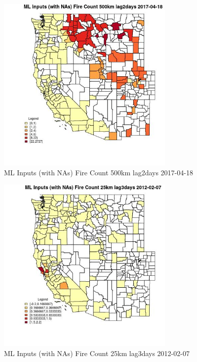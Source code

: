 \begin{figure} 
\centering  
\includegraphics[width=0.77\textwidth]{Code_Outputs/Report_ML_input_PM25_Step4_part_f_de_duplicated_aveswNAs_CountyFire_Count_500km_lag2daysMean2017-04-18.jpg} 
\caption{\label{fig:Report_ML_input_PM25_Step4_part_f_de_duplicated_aveswNAsCountyFire_Count_500km_lag2daysMean2017-04-18}ML Inputs (with NAs) Fire Count 500km lag2days 2017-04-18} 
\end{figure} 
 

\begin{figure} 
\centering  
\includegraphics[width=0.77\textwidth]{Code_Outputs/Report_ML_input_PM25_Step4_part_f_de_duplicated_aveswNAs_CountyFire_Count_25km_lag3daysMean2012-02-07.jpg} 
\caption{\label{fig:Report_ML_input_PM25_Step4_part_f_de_duplicated_aveswNAsCountyFire_Count_25km_lag3daysMean2012-02-07}ML Inputs (with NAs) Fire Count 25km lag3days 2012-02-07} 
\end{figure} 
 

